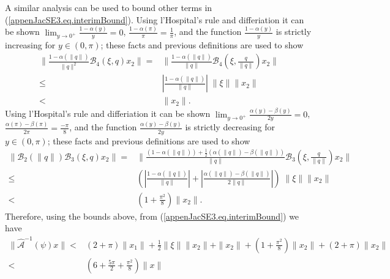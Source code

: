 A similar analysis can be used to bound other terms in
(\ref{appenJacSE3.eq.interimBound}).  Using l'Hospital's rule and
differiation it can be shown $\lim_{y\rightarrow
  0^+}\frac{1-\alpha(y)}{y}=0$,
$\frac{1-\alpha(\pi)}{\pi}=\frac{1}{\pi}$, and the function
$\frac{1-\alpha(y)}{y}$ is strictly increasing for $y\in\left(0,\pi
\right)$; these facts and previous definitions are used to show
%
\begin{align}
\|\frac{1-\alpha(\|q\|)}{\|q\|^2}\mathcal{B}_4\left( \xi, q\right)x_2\|
   =&\|\frac{1-\alpha(\|q\|)}{\|q\|}\mathcal{B}_4\left( \xi,\frac{q}{\|q\|}\right)x_2\|
\nonumber \\
   \leq& |\frac{1-\alpha(\|q\|)}{\|q\|}|\;\|\xi\|\|x_2\|
\nonumber \\
   <&\|x_2\|.
\nonumber
\end{align}
%
Using l'Hospital's rule and differiation it can be shown
$\lim_{y\rightarrow 0^+}\frac{\alpha(y)-\beta(y)}{2y}=0$,
$\frac{\alpha(\pi)-\beta(\pi)}{2\pi}=\frac{-\pi}{8}$, and the function
$\frac{\alpha(y)-\beta(y)}{2y}$ is strictly decreasing for
$y\in\left(0,\pi \right)$; these facts and previous definitions are
used to show
%
\begin{align}
\|\mathcal{B}_2(\|q\|)\mathcal{B}_3\left( \xi, q\right)x_2\|
   =&\|\frac{(1-\alpha(\|q\|))+\frac{1}{2}(\alpha(\|q\|)
     -\beta(\|q\|))}{\|q\|}\mathcal{B}_3\left( \xi,\frac{q}{\|q\|}\right)x_2\|
\nonumber \\
   \leq& \left(|\frac{1-\alpha(\|q\|)}{\|q\|}|+|
         \frac{\alpha(\|q\|)-\beta(\|q\|)}{2\|q\|} |\right)\;\|\xi\| \|x_2\|
\nonumber \\
   <&\left(1+\frac{\pi^2}{8}\right)\|x_2\|.
\end{align}
%
Therefore, using the bounds above, from (\ref{appenJacSE3.eq.interimBound}) we have
%
\begin{align}
\|\hat{\mathcal{A}}^{-1}(\psi)x\|<& \left(2+\pi\right)\|x_1\|+\frac{1}{2}\|\xi\|\|x_2\|
            +\|x_2\|+\left(1+\frac{\pi^2}{8}\right)\|x_2\|+\left(2+\pi\right)\|x_2\|
\nonumber \\
     <& \left(6+\frac{5\pi}{2}+\frac{\pi^2}{8}\right)\|x\|
\end{align}